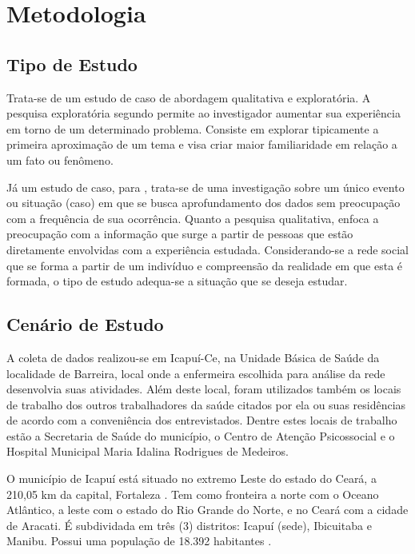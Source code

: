 \chapter{Metodologia}
\label{chap:metodologia}

\section{Tipo de Estudo}
Trata-se de um estudo de caso de abordagem qualitativa e exploratória. A pesquisa exploratória segundo \cite{leopardi2001metodologia} permite ao investigador aumentar sua experiência em torno de um determinado problema. Consiste em explorar tipicamente a primeira aproximação de um tema e visa criar maior familiaridade em relação a um fato ou fenômeno. 

Já um estudo de caso, para \cite{leopardi2001metodologia}, trata-se de uma investigação sobre um único evento ou situação (caso) em que se busca aprofundamento dos dados  sem preocupação com a frequência de sua ocorrência. Quanto a pesquisa qualitativa, \cite{leopardi2001metodologia} enfoca a preocupação com a informação que surge a partir de pessoas que estão diretamente envolvidas com a experiência estudada. Considerando-se a rede social que se forma a partir de um indivíduo e compreensão da realidade em que esta é formada, o tipo de estudo adequa-se a situação que se deseja estudar.

\section{Cenário de Estudo}
A coleta de dados realizou-se em Icapuí-Ce, na Unidade Básica de Saúde da localidade de Barreira, local onde a enfermeira escolhida para análise da rede desenvolvia suas atividades. Além deste local, foram utilizados também os locais de trabalho dos outros trabalhadores da saúde citados por ela ou suas residências de acordo com a conveniência dos entrevistados. Dentre estes locais de trabalho estão a Secretaria de Saúde do município, o Centro de Atenção Psicossocial e o Hospital Municipal Maria Idalina Rodrigues de Medeiros. 

O município de Icapuí está situado no extremo Leste do estado do Ceará, a 210,05 km da capital, Fortaleza \cite{der}. Tem como fronteira a norte com o Oceano Atlântico, a leste com o estado do Rio Grande do Norte, e no Ceará com a cidade de Aracati. É subdividada em três (3) distritos: Icapuí (sede), Ibicuitaba e Manibu. Possui uma população de 18.392 habitantes \cite{censo2010disponivel}.
  
